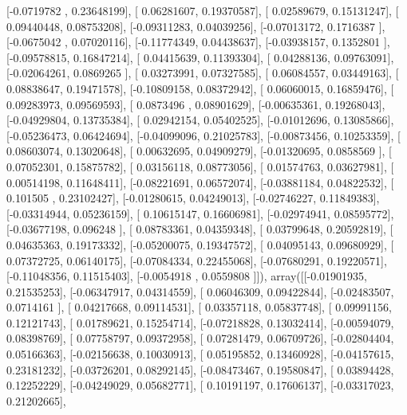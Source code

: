 \documentclass{article}
\begin{document}
       [-0.0719782 ,  0.23648199],
       [ 0.06281607,  0.19370587],
       [ 0.02589679,  0.15131247],
       [ 0.09440448,  0.08753208],
       [-0.09311283,  0.04039256],
       [-0.07013172,  0.1716387 ],
       [-0.0675042 ,  0.07020116],
       [-0.11774349,  0.04438637],
       [-0.03938157,  0.1352801 ],
       [-0.09578815,  0.16847214],
       [ 0.04415639,  0.11393304],
       [ 0.04288136,  0.09763091],
       [-0.02064261,  0.0869265 ],
       [ 0.03273991,  0.07327585],
       [ 0.06084557,  0.03449163],
       [ 0.08838647,  0.19471578],
       [-0.10809158,  0.08372942],
       [ 0.06060015,  0.16859476],
       [ 0.09283973,  0.09569593],
       [ 0.0873496 ,  0.08901629],
       [-0.00635361,  0.19268043],
       [-0.04929804,  0.13735384],
       [ 0.02942154,  0.05402525],
       [-0.01012696,  0.13085866],
       [-0.05236473,  0.06424694],
       [-0.04099096,  0.21025783],
       [-0.00873456,  0.10253359],
       [ 0.08603074,  0.13020648],
       [ 0.00632695,  0.04909279],
       [-0.01320695,  0.0858569 ],
       [ 0.07052301,  0.15875782],
       [ 0.03156118,  0.08773056],
       [ 0.01574763,  0.03627981],
       [ 0.00514198,  0.11648411],
       [-0.08221691,  0.06572074],
       [-0.03881184,  0.04822532],
       [ 0.101505  ,  0.23102427],
       [-0.01280615,  0.04249013],
       [-0.02746227,  0.11849383],
       [-0.03314944,  0.05236159],
       [ 0.10615147,  0.16606981],
       [-0.02974941,  0.08595772],
       [-0.03677198,  0.096248  ],
       [ 0.08783361,  0.04359348],
       [ 0.03799648,  0.20592819],
       [ 0.04635363,  0.19173332],
       [-0.05200075,  0.19347572],
       [ 0.04095143,  0.09680929],
       [ 0.07372725,  0.06140175],
       [-0.07084334,  0.22455068],
       [-0.07680291,  0.19220571],
       [-0.11048356,  0.11515403],
       [-0.0054918 ,  0.0559808 ]]), array([[-0.01901935,  0.21535253],
       [-0.06347917,  0.04314559],
       [ 0.06046309,  0.09422844],
       [-0.02483507,  0.0714161 ],
       [ 0.04217668,  0.09114531],
       [ 0.03357118,  0.05837748],
       [ 0.09991156,  0.12121743],
       [ 0.01789621,  0.15254714],
       [-0.07218828,  0.13032414],
       [-0.00594079,  0.08398769],
       [ 0.07758797,  0.09372958],
       [ 0.07281479,  0.06709726],
       [-0.02804404,  0.05166363],
       [-0.02156638,  0.10030913],
       [ 0.05195852,  0.13460928],
       [-0.04157615,  0.23181232],
       [-0.03726201,  0.08292145],
       [-0.08473467,  0.19580847],
       [ 0.03894428,  0.12252229],
       [-0.04249029,  0.05682771],
       [ 0.10191197,  0.17606137],
       [-0.03317023,  0.21202665],
\end{document}
